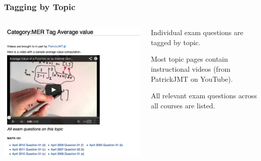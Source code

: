 \documentclass{beamer}
\begin{document}
\frame
{\frametitle{\bf{Tagging by Topic}}
\begin{columns}
\begin{column}{0.6\textwidth}
\includegraphics[width=\textwidth]{tag_with_video2.jpg}
\end{column}
\begin{column}{0.4\textwidth}
Individual exam questions are tagged by topic.

\medskip

Most topic pages contain instructional videos (from PatrickJMT on YouTube).

\medskip

All relevant exam questions across all courses are listed.
\end{column}
\end{columns}
}
\end{document}
